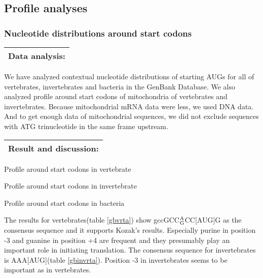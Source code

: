 \subsection{Profile analyses}
\subsubsection{Nucleotide distributions around start codons}
\vspace{2ex}
\noindent
\begin{tabular}{|l|}
\hline
Data analysis:\\
\hline
\end{tabular}

We have analyzed
 contextual nucleotide distributions of starting AUGs for all of vertebrates,
invertebrates and bacteria in the GenBank Database.
We also analyzed profile around start codons of mitochondria of
vertebrates and invertebrates. Because mitochondrial mRNA data were
less, we used 
DNA data. And to get enough data of mitochondrial sequences, we did
not exclude sequences with  
ATG trinucleotide in the same frame upstream.

\vspace{2ex}
\noindent
\begin{tabular}{|l|}
\hline
Result and discussion:\\
\hline
\end{tabular}

\begin{table}
\caption{Profile around start codons in vertebrate}
\label{gbvrta}
\end{table}

\begin{table}
\caption{Profile around start codons in invertebrate}
\label{gbinvrta}
\end{table}

\begin{table}
\caption{Profile around start codons in bacteria}
\label{bun_bct}
\end{table}


The results for vertebrates(table \ref{gbvrta})
 show gccGCC$^{\rm A}_{\rm G}$CC[AUG]G as the consensus
sequence and it supports Kozak's results\cite{label3}.
Especially purine in position -3 and guanine in position +4 are frequent
and they presumably play an important role in initiating translation.
The consensus sequence for invertebrates is AAA[AUG](table
\ref{gbinvrta}).  Position -3 in
invertebrates seems to be important as in vertebrates.

